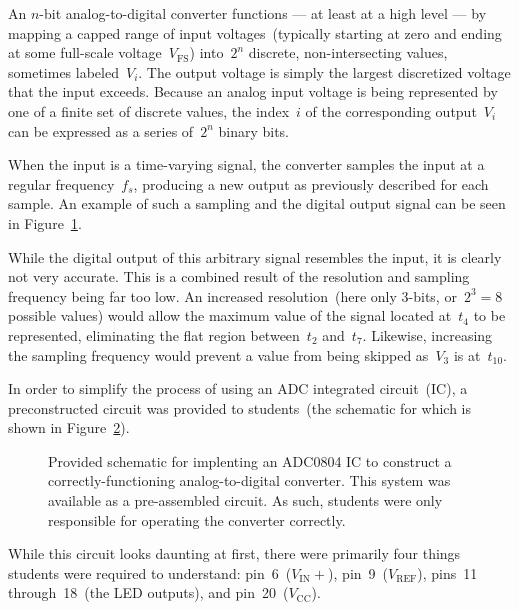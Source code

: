 An $n$-bit analog-to-digital converter functions --- at least at a high level
--- by mapping a capped range of input voltages~(typically starting at zero and ending
at some full-scale voltage~$V_\text{FS}$) into~$2^n$ discrete, non-intersecting
values, sometimes labeled~$V_i$.  The output voltage is simply the largest
discretized voltage that the input exceeds.  Because an analog input voltage is
being represented by one of a finite set of discrete values, the index~$i$ of
the corresponding output~$V_i$ can be expressed as a series of~$2^n$ binary
bits.

When the input is a time-varying signal, the converter samples the input
at a regular frequency~$f_s$, producing a new output as previously described
for each sample.  An example of such a sampling and the digital output signal
can be seen in Figure~\ref{fig:theory}.
%
\begin{figure}[H]
	\centering
	\caption{}
	\label{fig:theory}
\end{figure}
%
While the digital output of this arbitrary signal resembles the input, it is
clearly not very accurate.  This is a combined result of the resolution and
sampling frequency being far too low.  An increased resolution~(here only
3-bits, or~$2^3 = 8$ possible values) would allow the maximum value of the
signal located at~$t_4$ to be represented, eliminating the flat region
between~$t_2$ and~$t_7$.  Likewise, increasing the sampling frequency would
prevent a value from being skipped as~$V_3$ is at~$t_{10}$.

In order to simplify the process of using an ADC integrated circuit~(IC), a
preconstructed circuit was provided to students~(the schematic for which is
shown in Figure~\ref{fig:adcSchem}).
%
\begin{figure}[H]
	\centering
	
	\parbox{.8\textwidth}{
	\caption[ADC Schematic]{Provided schematic for implenting an ADC0804 IC to
	construct a correctly-functioning analog-to-digital converter.  This system
	was available as a pre-assembled circuit.  As such, students were only
	responsible for operating the converter correctly.}
	\label{fig:adcSchem}}
\end{figure}
%
While this circuit looks daunting at first, there were primarily four things
students were required to understand:  pin~6~($V_\text{IN}+$),
pin~9~($V_\text{REF}$), pins~11 through~18~(the LED outputs), and
pin~20~($V_\text{CC}$).

